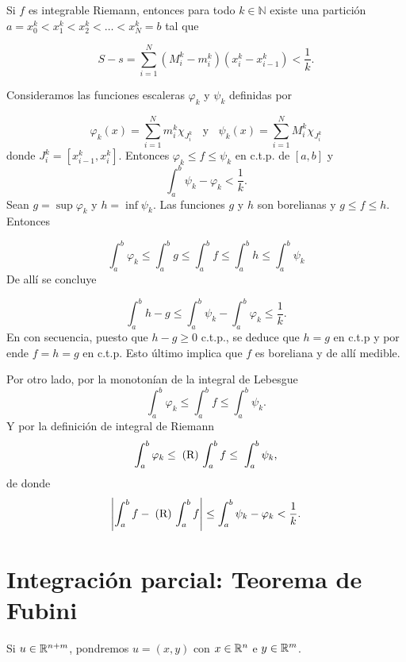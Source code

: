                     \begin{demo}      
        Si $f$ es integrable Riemann, entonces para todo $k\in\mathbb{N}$  existe una partición $a=x_0^k<x_1^k<x_2^k<\ldots<x_N^k=b$ tal que 
        
        $$S-s=\sum_{i=1}^N(M_i^k-m_i^k)(x_{i}^k-x_{i-1}^k)<\frac{1}{k}.$$
        
        Consideramos   las funciones escaleras $\varphi_k$ y $\psi_k$ definidas por
        
       \[
        \varphi_k(x)=\sum\limits_{i=1}^N m_i^k \chi_{J^k_i} \;\;\mbox{ y }\;\;
        \psi_k(x)=\sum\limits_{i=1}^N M_i^k \chi_{J_i^k} 
        \]
        donde 
        $J_i^k=[x^k_{i-1},x^k_i]$. Entonces $\varphi_k \leq f \leq \psi_k$ en c.t.p. de $[a,b]$ y 
        \[
        \int_a^b \psi_k -\varphi_k <\frac{1}{k}.
        \]
        Sean  $g=\sup\varphi_k$ y $h=\inf \psi_k$. Las funciones       $g$ y $h$ son borelianas y $g\leq f\leq h$. Entonces 
        
        
        $$ \int_a^b \varphi_k \leq \int_a^b g \leq \int_a^b f\leq \int_a^b h   \leq \int_a^b \psi_k $$
       De allí se concluye
       
        $$\int_a^b h- g   \leq \int_a^b \psi_k -\int_a^b \varphi_k \leq \frac{1}{k}. $$
        En con secuencia, puesto que $h-g\geq 0$ c.t.p., se deduce que $h=g$ en c.t.p y por ende $f=h=g$ en c.t.p. Esto último implica que $f$ es boreliana y de allí medible.
        
        Por otro lado, por la monotonían de la integral de Lebesgue
        \[
        \int_a^b \varphi_k \leq \int_a^b f \leq \int_a^b \psi_k.
        \]
        Y por la definición de integral de Riemann
        \[
        \int_a^b \varphi_k \leq\;  \text{(R)} \,\int_a^b f \leq\;  \int_a^b \psi_k,
        \]
        de donde
        \[
        \left|
        \int_a^b f -\; \text{(R)}\,\int_a^b f
        \right|\leq 
        \int_a^b \psi_k - \varphi_k <\frac{1}{k}.
        \]
                            \end{demo}
                            
                            \section{Integraci\'on parcial: Teorema de Fubini}
                            
        Si $u \in \mathbb{R}^{n+m}$, pondremos $u=(x,y)$
        con $x \in \mathbb{R}^n$ e $y \in \mathbb{R}^m$. 
        

